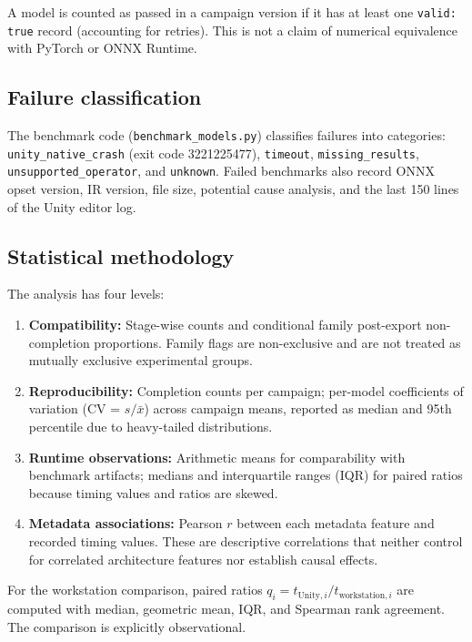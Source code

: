\documentclass[10pt,twocolumn]{article}
\begin{document}
A model is counted as passed in a campaign version if it has at least one \texttt{valid: true} record (accounting for retries). This is not a claim of numerical equivalence with PyTorch or ONNX Runtime.

\subsection{Failure classification}

The benchmark code (\texttt{benchmark\_models.py}) classifies failures into categories: \texttt{unity\_native\_crash} (exit code 3221225477), \texttt{timeout}, \texttt{missing\_results}, \texttt{unsupported\_operator}, and \texttt{unknown}. Failed benchmarks also record ONNX opset version, IR version, file size, potential cause analysis, and the last 150 lines of the Unity editor log.

\subsection{Statistical methodology}

The analysis has four levels:
\begin{enumerate}[nosep,leftmargin=*]
  \item \textbf{Compatibility:} Stage-wise counts and conditional family post-export non-completion proportions. Family flags are non-exclusive and are not treated as mutually exclusive experimental groups.
  \item \textbf{Reproducibility:} Completion counts per campaign; per-model coefficients of variation (CV = $s/\bar{x}$) across campaign means, reported as median and 95th percentile due to heavy-tailed distributions.
  \item \textbf{Runtime observations:} Arithmetic means for comparability with benchmark artifacts; medians and interquartile ranges (IQR) for paired ratios because timing values and ratios are skewed.
  \item \textbf{Metadata associations:} Pearson $r$ between each metadata feature and recorded timing values. These are descriptive correlations that neither control for correlated architecture features nor establish causal effects.
\end{enumerate}

For the workstation comparison, paired ratios $q_i = t_{\mathrm{Unity},i} / t_{\mathrm{workstation},i}$ are computed with median, geometric mean, IQR, and Spearman rank agreement. The comparison is explicitly observational.
\end{document}
